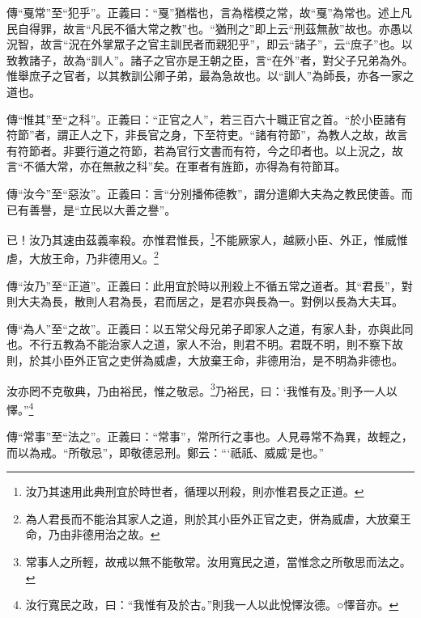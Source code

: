 {\noindent\zhuan{}\fzbyks 傳“戛常”至“犯乎”。正義曰：“戛”猶楷也，言為楷模之常，故“戛”為常也。述上凡民自得罪，故言“凡民不循大常之教”也。“猶刑之”即上云“刑茲無赦”故也。亦愚以況智，故言“況在外掌眾子之官主訓民者而親犯乎”，即云“諸子”，云“庶子”也。以致教諸子，故為“訓人”。諸子之官亦是王朝之臣，言“在外”者，對父子兄弟為外。惟舉庶子之官者，以其教訓公卿子弟，最為急故也。以“訓人”為師長，亦各一家之道也。 \par}

{\noindent\zhuan{}\fzbyks 傳“惟其”至“之科”。正義曰：“正官之人”，若三百六十職正官之首。“於小臣諸有符節”者，謂正人之下，非長官之身，下至符吏。“諸有符節”，為教人之故，故言有符節者。非要行道之符節，若為官行文書而有符，今之印者也。以上況之，故言“不循大常，亦在無赦之科”矣。在軍者有旌節，亦得為有符節耳。 \par}

{\noindent\zhuan{}\fzbyks 傳“汝今”至“惡汝”。正義曰：言“分別播佈德教”，謂分遣卿大夫為之教民使善。而已有善譽，是“立民以大善之譽”。 \par}

已！汝乃其速由茲義率殺。亦惟君惟長，\footnote{汝乃其速用此典刑宜於時世者，循理以刑殺，則亦惟君長之正道。}不能厥家人，越厥小臣、外正，惟威惟虐，大放王命，乃非德用乂。\footnote{為人君長而不能治其家人之道，則於其小臣外正官之吏，併為威虐，大放棄王命，乃由非德用治之故。}


{\noindent\zhuan{}\fzbyks 傳“汝乃”至“正道”。正義曰：此用宜於時以刑殺上不循五常之道者。其“君長”，對則大夫為長，散則人君為長，君而居之，是君亦與長為一。對例以長為大夫耳。 \par}

{\noindent\zhuan{}\fzbyks 傳“為人”至“之故”。正義曰：以五常父母兄弟子即家人之道，有家人卦，亦與此同也。不行五教為不能治家人之道，家人不治，則君不明。君既不明，則不察下故則，於其小臣外正官之吏併為威虐，大放棄王命，非德用治，是不明為非德也。 \par}

汝亦罔不克敬典，乃由裕民，惟之敬忌。\footnote{常事人之所輕，故戒以無不能敬常。汝用寬民之道，當惟念之所敬思而法之。}乃裕民，曰：‘我惟有及。’則予一人以懌。”\footnote{汝行寬民之政，曰：“我惟有及於古。”則我一人以此悅懌汝德。○懌音亦。}

{\noindent\zhuan{}\fzbyks 傳“常事”至“法之”。正義曰：“常事”，常所行之事也。人見尋常不為異，故輕之，而以為戒。“所敬忌”，即敬德忌刑。鄭云：“‘祇祇、威威’是也。” \par}


